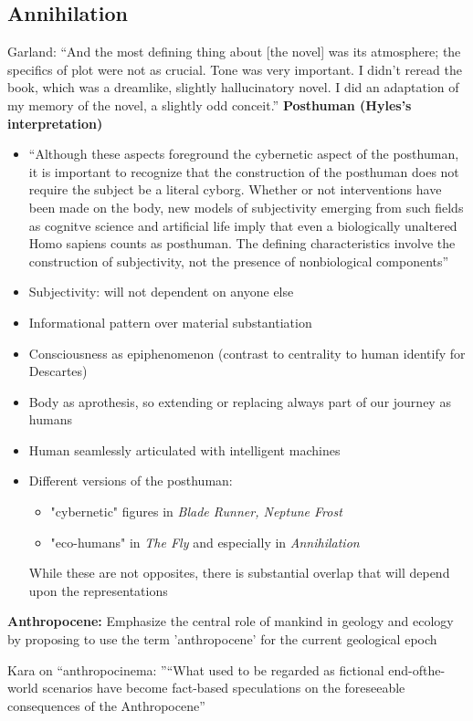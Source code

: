 \documentclass[11pt,fleqn]{book} %
\begin{document}
\subsection{Annihilation}
Garland: \enquote{And the most defining thing about
[the novel] was its atmosphere;
the specifics of plot were not as
crucial. Tone was very important.
I didn’t reread the book, which
was a dreamlike, slightly
hallucinatory novel. I did an
adaptation of my memory of the
novel, a slightly odd conceit.}
\textbf{Posthuman (Hyles's interpretation)}
\begin{itemize}
    \item \enquote{Although these aspects foreground the cybernetic aspect of the posthuman, it is important
to recognize that the construction of the posthuman does not require the subject be a literal
cyborg. Whether or not interventions have been made on the body, new models of
subjectivity emerging from such fields as cognitve science and artificial life imply that even a
biologically unaltered Homo sapiens counts as posthuman. The defining characteristics
involve the construction of subjectivity, not the presence of nonbiological components}
    \item Subjectivity: will not dependent on anyone else
    \item Informational pattern over material substantiation
    \item Consciousness as epiphenomenon (contrast to centrality to human identify for Descartes)
    \item Body as aprothesis, so extending or replacing always part of our journey as humans
    \item Human seamlessly articulated with intelligent machines
    \item Different versions of the posthuman:
    \begin{itemize}
        \item "cybernetic" figures in \textit{Blade Runner, Neptune Frost}
        \item "eco-humans" in \textit{The Fly} and especially in \textit{Annihilation} 
    \end{itemize} While these are not opposites, there is substantial overlap that will depend upon the representations
\end{itemize}
\textbf{Anthropocene: }Emphasize the central role of mankind in geology and ecology by proposing to use the term 'anthropocene' for the current geological epoch

Kara on \enquote{anthropocinema: }\enquote{What used to be regarded as fictional end-ofthe-world scenarios have become fact-based
speculations on the foreseeable consequences
of the Anthropocene}
\end{document}
